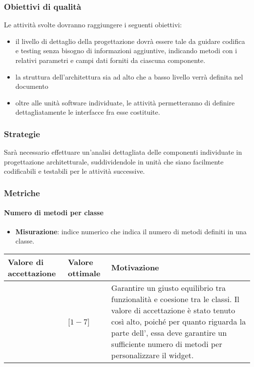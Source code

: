 \subsubsection{Obiettivi di qualità}
Le attività svolte dovranno raggiungere i seguenti obiettivi:
\begin{itemize}
\item il livello di dettaglio della progettazione dovrà essere tale da guidare codifica e testing senza bisogno di informazioni aggiuntive, indicando metodi con i relativi parametri e campi dati forniti da ciascuna componente.
\item la struttura dell'architettura sia ad alto che a basso livello verrà definita nel documento \DDP
\item oltre alle unità software individuate, le attività permetteranno di definire dettagliatamente le interfacce fra esse costituite.
\end{itemize}

\subsubsection{Strategie}

Sarà necessario effettuare un'analisi dettagliata delle componenti individuate in progettazione architetturale, suddividendole in unità che siano facilmente codificabili e testabili per le attività successive.

\subsubsection{Metriche}

\paragraph{Numero di metodi per classe}

\begin{itemize}
\item \textbf{Misurazione}: indice numerico che indica il numero di metodi definiti in una classe.
\end{itemize}


\begin{center}
\begin{tabular}{|P{2.5cm}|P{2.5cm}|P{6cm}|}
		\hline
			\textbf{Valore di accettazione}	& \textbf{Valore ottimale} & \textbf{Motivazione} \\
			\hline
			[$1 - 15$] & [$1 - 7$] &	Garantire un giusto equilibrio tra funzionalità e coesione tra le classi. Il valore di accettazione è stato tenuto così alto, poiché per quanto riguarda la parte dell', essa deve garantire un sufficiente numero di metodi per personalizzare il widget. \\
			\hline
			\end{tabular}
\end{center}

